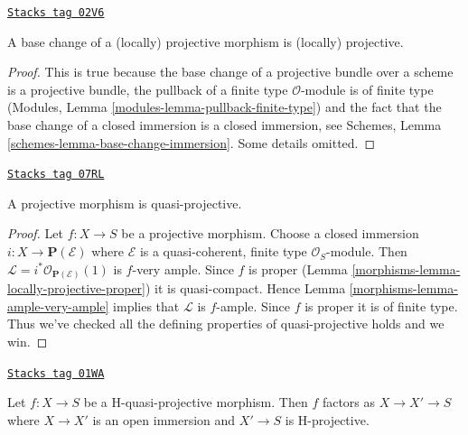 \begin{lemma}
\label{morphisms-lemma-base-change-projective}
\href{https://stacks.math.columbia.edu/tag/02V6}{\texttt{Stacks tag 02V6}}

A base change of a (locally) projective morphism is (locally) projective.
\end{lemma}

\begin{proof}
This is true because the base change of a projective bundle
over a scheme is a projective bundle, the pullback of
a finite type $\mathcal{O}$-module is of finite type
(Modules, Lemma \ref{modules-lemma-pullback-finite-type})
and the fact that the base
change of a closed immersion is a closed immersion, see
Schemes, Lemma \ref{schemes-lemma-base-change-immersion}.
Some details omitted.
\end{proof}

\begin{lemma}
\label{morphisms-lemma-projective-quasi-projective}
\href{https://stacks.math.columbia.edu/tag/07RL}{\texttt{Stacks tag 07RL}}

A projective morphism is quasi-projective.
\end{lemma}

\begin{proof}

Let $f : X \to S$ be a projective morphism. Choose a closed immersion
$i : X \to \mathbf{P}(\mathcal{E})$ where $\mathcal{E}$ is a quasi-coherent,
finite type $\mathcal{O}_S$-module. Then
$\mathcal{L} = i^*\mathcal{O}_{\mathbf{P}(\mathcal{E})}(1)$ is $f$-very ample.
Since $f$ is proper (Lemma \ref{morphisms-lemma-locally-projective-proper})
it is quasi-compact. Hence Lemma \ref{morphisms-lemma-ample-very-ample} implies
that $\mathcal{L}$ is $f$-ample. Since $f$ is proper it is of finite type.
Thus we've checked all the defining properties of quasi-projective
holds and we win.
\end{proof}

\begin{lemma}
\label{morphisms-lemma-H-quasi-projective-open-H-projective}
\href{https://stacks.math.columbia.edu/tag/01WA}{\texttt{Stacks tag 01WA}}

Let $f : X \to S$ be a H-quasi-projective morphism.
Then $f$ factors as $X \to X' \to S$ where $X \to X'$ is an
open immersion and $X' \to S$ is H-projective.
\end{lemma}


